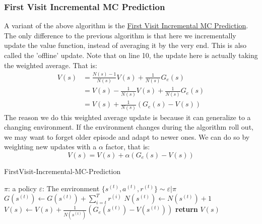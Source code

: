 \documentclass[11pt]{article}
\begin{document}
\subsubsection{First Visit Incremental MC Prediction}
A variant of the above algorithm is the \hyperref[alg:fvimp]{First Visit Incremental MC Prediction}. The only difference to the previous algorithm is that here we incrementally update the value function, instead of averaging it by the very end. This is also called the 'offline' update. Note that on line 10, the update here is actually taking the weighted average. That is:
\begin{align*}
    V(s) &= \frac{N(s) - 1}{N(s)} V(s) + \frac{1}{N(s)} G_e(s) \\
    &= V(s) - \frac{1}{N(s)} V(s) + \frac{1}{N(s)} G_e(s) \\
    &= V(s) + \frac{1}{N(s)} (G_e(s) - V(s))
\end{align*}
The reason we do this weighted average update is because it can generalize to a changing environment. If the environment changes during the algorithm roll out, we may want to forget older episode and adapt to newer ones. We can do so by weighting new updates with a \(\alpha\) factor, that is:
\[V(s) = V(s) + \alpha (G_e(s) - V(s))\]
\begin{algorithm}
\caption{FirstVisit-Incremental-MC-Prediction}
\label{alg:fvimp}
\begin{algorithmic}[1]
\State $\pi$: a policy
\State $\varepsilon$: The environment
    \State $\{s^{(t)}, a^{(t)}, r^{(t)}\} \sim \varepsilon | \pi$
            \State $G(s^{(t)}) \gets G(s^{(t)}) + \sum_{i=t}^T r^{(i)}$
            \State $N(s^{(t)}) \gets N(s^{(t)}) + 1$
            \State $V(s) \gets V(s) + \frac{1}{N(s^{(t)})} (G_e(s^{(t)}) - V(s^{(t)}))$
        \EndIf
        \EndFor
    \EndFor
    \State \textbf{return} $V(s)$
    \EndProcedure
\end{algorithmic}
\end{algorithm}
\end{document}
